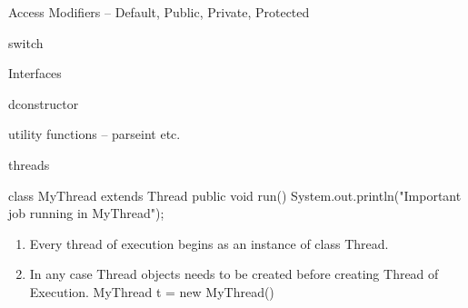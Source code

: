 \documentclass[11pt]{beamer}
\begin{document}
\begin{frame}{Access Modifiers -- Default, Public, Private, Protected}



\begin{frame}{switch}

\end{frame}


\begin{frame}{Interfaces}

\end{frame}


\begin{frame}{dconstructor}

\end{frame}



\begin{frame}{utility functions -- parseint etc.}

\end{frame}



\begin{frame}{threads}

\begin{java}
class MyThread extends Thread
{
public void run()
{
System.out.println("Important job running in MyThread");
}
}

\end{java}

\begin{enumerate}
\item Every thread of execution begins as an instance of class Thread.
\item  In any case Thread objects needs to be created before creating Thread of Execution.
\iten MyThread t = new MyThread()



\end{enumerate}
\end{frame}



\end{frame}
\end{document}

